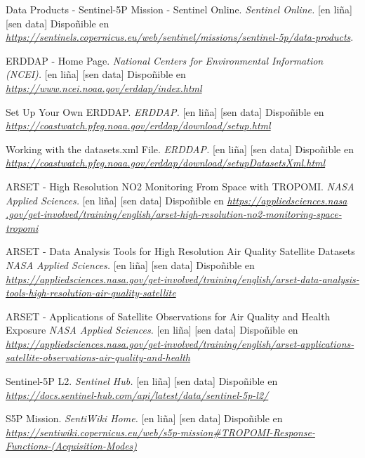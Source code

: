 

\begin{thebibliography}{99}
     Data Products - Sentinel-5P Mission - Sentinel Online. \textit{Sentinel Online.} [en liña] [sen data] Dispoñible en \textit{\url{ https://sentinels.copernicus.eu/web/sentinel/missions/sentinel-5p/data-products}}.

     ERDDAP - Home Page. \textit{National Centers for Environmental Information (NCEI).} [en liña] [sen data] Dispoñible en \textit{\url{ https://www.ncei.noaa.gov/erddap/index.html}}

     Set Up Your Own ERDDAP. \textit{ERDDAP.} [en liña] [sen data] Dispoñible en \textit{\url{ https://coastwatch.pfeg.noaa.gov/erddap/download/setup.html}}

     Working with the datasets.xml File. \textit{ERDDAP.} [en liña] [sen data] Dispoñible en \textit{\url{ https://coastwatch.pfeg.noaa.gov/erddap/download/setupDatasetsXml.html}}

     ARSET - High Resolution NO2 Monitoring From Space with TROPOMI. \textit{NASA Applied Sciences.} [en liña] [sen data] Dispoñible en \textit{\url{ https://appliedsciences.nasa
.gov/get-involved/training/english/arset-high-resolution-no2-monitoring-space-tropomi}}

     ARSET - Data Analysis Tools for High Resolution Air Quality Satellite Datasets \textit{NASA Applied Sciences.} [en liña] [sen data] Dispoñible en \textit{\url{https://appliedsciences.nasa.gov/get-involved/training/english/arset-data-analysis-tools-high-resolution-air-quality-satellite}}

     ARSET - Applications of Satellite Observations for Air Quality and Health Exposure \textit{NASA Applied Sciences.} [en liña] [sen data] Dispoñible en \textit{\url{https://appliedsciences.nasa.gov/get-involved/training/english/arset-applications-satellite-observations-air-quality-and-health}}

     Sentinel-5P L2. \textit{Sentinel Hub.} [en liña] [sen data] Dispoñible en \textit{\url{ https://docs.sentinel-hub.com/api/latest/data/sentinel-5p-l2/}}

     S5P Mission. \textit{SentiWiki Home.} [en liña] [sen data] Dispoñible en \textit{\url{https://sentiwiki.copernicus.eu/web/s5p-mission\#TROPOMI-Response-Functions-(Acquisition-Modes)}}


\end{thebibliography}
